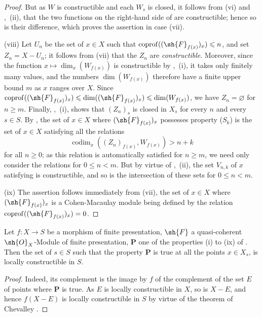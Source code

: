 \begin{proof}
But as $W$ is constructible  and each $W_s$ is closed, it follows from (vi) and ,~(ii), that the two functions on the right-hand side of  are constructible; hence so is their difference, which proves the assertion in case (vii).

(viii) Let $U_n$ be the set of $x\in X$ such that $\operatorname{coprof}((\sh{F}_{f(x)})_x)\leqslant n$, and set $Z_n=X-U_n$; it follows from (vii) that the $Z_n$ are \emph{constructible}.
Moreover, since the function $x\mapsto\dim_x(W_{f(x)})$ is constructible by ,~(i), it takes only finitely many values, and the numbers $\dim(W_{f(x)})$ therefore have a finite upper bound $m$ as $x$ ranges over $X$.
Since $\operatorname{coprof}((\sh{F}_{f(x)})_x)\leqslant\dim((\sh{F}_{f(x)})_x)\leqslant\dim(W_{f(x)})$, we have $Z_n=\varnothing$ for $n\geqslant m$.
Finally, ,~(i), shows that $(Z_n)_s$ is closed in $X_s$ for every $n$ and every $s\in S$.
By , the set of $x\in X$ where $(\sh{F}_{f(x)})_x$ possesses property ($S_k$) is the set of $x\in X$ satisfying all the relations
\begin{equation}
\tag{9.9.2.2}
\label{IV.9.9.2.2}
  \operatorname{codim}_x((Z_n)_{f(x)},W_{f(x)})>n+k
\end{equation}
for all $n\geqslant 0$; as this relation is automatically satisfied for $n\geqslant m$, we need only consider the relations  for $0\leqslant n<m$.
But by virtue of ,~(ii), the set $V_{n,k}$ of $x$ satisfying  is constructible, and so is the intersection of these sets for $0\leqslant n<m$.

(ix) The assertion follows immediately from (vii), the set of $x\in X$ where $(\sh{F}_{f(x)})_x$ is a Cohen-Macaulay module being defined by the relation $\operatorname{coprof}((\sh{F}_{f(x)})_x)=0$.
\end{proof}

\begin{corollary}[9.9.3]
\label{IV.9.9.3}
Let $f:X\to S$ be a morphism of finite presentation, $\sh{F}$ a quasi-coherent $\sh{O}_X$-Module of finite presentation, $\mathbf{P}$ one of the properties (i) to (ix) of .
Then the set of $s\in S$ such that the property $\mathbf{P}$ is true at all the points $x\in X_s$, is locally constructible in $S$.
\end{corollary}

\begin{proof}
\label{IV.9.9.3-proof}
Indeed, its complement is the image by $f$ of the complement of the set $E$ of points where $\mathbf{P}$ is true.
As $E$ is locally constructible in $X$, so is $X-E$, and hence $f(X-E)$ is locally constructible in $S$ by virtue of the theorem of Chevalley .
\end{proof}

